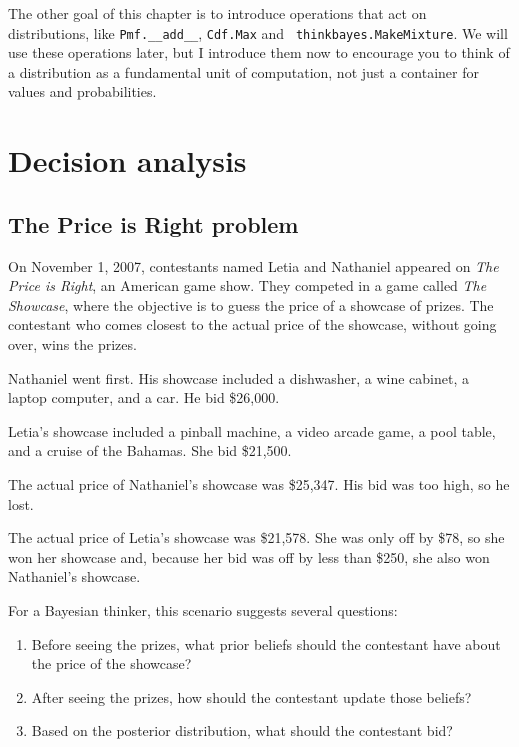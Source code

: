 \documentclass[12pt]{book}
\begin{document}
The other goal of this chapter is to introduce operations that act on
distributions, like \verb"Pmf.__add__", {\tt Cdf.Max} and {\tt
  thinkbayes.MakeMixture}.  We will use these operations later, but I
introduce them now to encourage you to think of a distribution as a
fundamental unit of computation, not just a container for values and
probabilities.



\chapter{Decision analysis}
\label{decisionanalysis}

\section{The Price is Right problem}

On November 1, 2007, contestants named Letia and Nathaniel appeared
on {\it The Price is Right}, an American game show.  They competed in
a game called {\it The Showcase}, where the objective is to guess the price
of a showcase of prizes.  The contestant who comes closest to the
actual price of the showcase, without going over, wins the prizes.

Nathaniel went first.  His showcase included a dishwasher, a wine
cabinet, a laptop computer, and a car.  He bid \$26,000.

Letia's showcase included a pinball machine, a video arcade game, a
pool table, and a cruise of the Bahamas.  She bid \$21,500.

The actual price of Nathaniel's showcase was \$25,347.  His bid
was too high, so he lost.

The actual price of Letia's showcase was \$21,578.  She was only
off by \$78, so she won her showcase and, because
her bid was off by less than \$250, she also won Nathaniel's
showcase.

For a Bayesian thinker, this scenario suggests several questions:

\begin{enumerate}

\item Before seeing the prizes, what prior beliefs should the
  contestant have about the price of the showcase?

\item After seeing the prizes, how should the contestant update
  those beliefs?

\item Based on the posterior distribution, what should the
  contestant bid?

\end{enumerate}
\end{document}
